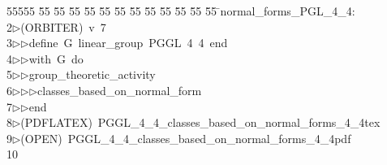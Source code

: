 %
%
\begin{tabbing}
55555 \= 55 \= 55 \= 55 \= 55 \= 55 \= 55 \= 55 \= 55 \= 55 \= 55 \= 55 \= 55 \= \>normal\_forms\_PGL\_4\_4:\\[0pt]
2\>$\triangleright$\>(ORBITER)\ v\ 7\ \\[0pt]
3\>$\triangleright$\>$\triangleright$\>define\ G\ linear\_group\ PGGL\ 4\ 4\ end\ \\[0pt]
4\>$\triangleright$\>$\triangleright$\>with\ G\ do\ \\[0pt]
5\>$\triangleright$\>$\triangleright$\>group\_theoretic\_activity\ \\[0pt]
6\>$\triangleright$\>$\triangleright$\>$\triangleright$\>classes\_based\_on\_normal\_form\ \\[0pt]
7\>$\triangleright$\>$\triangleright$\>end\\[0pt]
8\>$\triangleright$\>(PDFLATEX)\ PGGL\_4\_4\_classes\_based\_on\_normal\_forms\_4\_4tex\\[0pt]
9\>$\triangleright$\>(OPEN)\ PGGL\_4\_4\_classes\_based\_on\_normal\_forms\_4\_4pdf\\[0pt]
10\>\end{tabbing}
